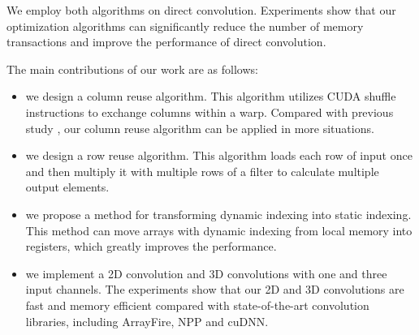 We employ both algorithms on direct convolution. Experiments show that our optimization algorithms can significantly reduce the number of
memory transactions and improve the performance of direct convolution.

The main contributions of our work are as follows:
\begin{itemize}
  \item we design a column reuse algorithm. This algorithm utilizes CUDA shuffle instructions to exchange columns within a warp. Compared
      with previous study \cite{vasilache2014fast}, our column reuse algorithm can be applied in more situations.
  \item we design a row reuse algorithm. This algorithm loads each row of input once and then multiply it with multiple rows of a filter
      to calculate multiple output elements.
  \item we propose a method for transforming dynamic indexing into static indexing. This method can move arrays with dynamic indexing
      from local memory into registers, which greatly improves the performance.
  \item we implement a 2D convolution and 3D convolutions with one and three input channels. The experiments show that our 2D and 3D
      convolutions are fast and memory efficient compared with state-of-the-art convolution libraries, including ArrayFire, NPP and
      cuDNN.
\end{itemize}
